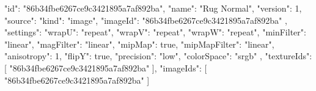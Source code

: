 {
  "id": "86b34fbe6267ce9c3421895a7af892ba",
  "name": "Rug Normal",
  "version": 1,
  "source": {
    "kind": "image",
    "imageId": "86b34fbe6267ce9c3421895a7af892ba"
  },
  "settings": {
    "wrapU": "repeat",
    "wrapV": "repeat",
    "wrapW": "repeat",
    "minFilter": "linear",
    "magFilter": "linear",
    "mipMap": true,
    "mipMapFilter": "linear",
    "anisotropy": 1,
    "flipY": true,
    "precision": "low",
    "colorSpace": "srgb"
  },
  "textureIds": [
    "86b34fbe6267ce9c3421895a7af892ba"
  ],
  "imageIds": [
    "86b34fbe6267ce9c3421895a7af892ba"
  ]
}
